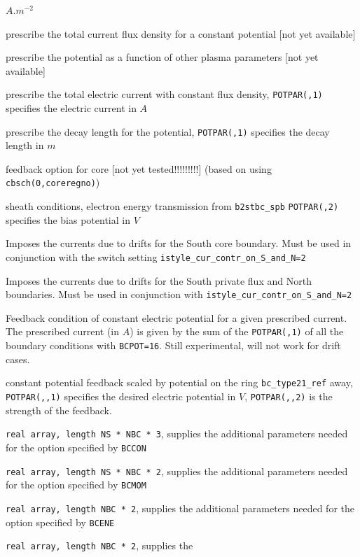 \documentclass[a4paper,10pt]{report}
\begin{document}
\begin{description}
\begin{description}
    $A.m^{-2}$
  \item[6] prescribe the total current flux density for a
  constant potential [not yet available]
  \item[7] prescribe the potential as a function of other
  plasma parameters [not yet available]
  \item[8] prescribe the total electric current with constant flux
  density, {\tt POTPAR(,1)} specifies the electric current in $A$
  \item[9] prescribe the decay length for the potential,
  {\tt POTPAR(,1)} specifies the decay length in $m$
  \item[10] feedback option for core [not yet tested!!!!!!!!!] (based
  on using {\tt cbsch(0,coreregno)})
  \item[11] sheath conditions, electron energy transmission from {\tt b2stbc\_spb}
  {\tt POTPAR(,2)} specifies the bias potential in $V$
  \item[12] Imposes the currents due to drifts for the South core boundary. Must be used in conjunction with the switch setting {\tt \allowbreak istyle\_cur\_contr\_on\_S\_and\_N=2}
  \item[13] Imposes the currents due to drifts for the South private flux and North boundaries. Must be used in conjunction with {\tt \allowbreak istyle\_cur\_contr\_on\_S\_and\_N=2}
  \item[16] Feedback condition of constant electric potential for a given prescribed current. The prescribed current (in $A$) is given by the sum of the {\tt POTPAR(,1)} of all the boundary conditions with {\tt BCPOT=16}. Still experimental, will not work for drift cases.
  \item[21] constant potential feedback scaled by potential on the ring {\tt bc\_type21\_ref} away,
  {\tt POTPAR(,,1)} specifies the desired electric potential in $V$,
  {\tt POTPAR(,,2)} is the strength of the feedback.
  \end{description}
\item[CONPAR] {\tt real array, length NS * NBC * 3}, supplies
  the additional parameters needed for the option specified by
  {\tt BCCON}
\item[MOMPAR] {\tt real array, length NS * NBC * 2}, supplies
  the additional parameters needed for the option specified by
  {\tt BCMOM}
\item[ENEPAR] {\tt real array, length NBC * 2}, supplies the
  additional parameters needed for the option specified by
  {\tt BCENE}
\item[ENIPAR] {\tt real array, length NBC * 2}, supplies the

\end{description}
\end{document}
